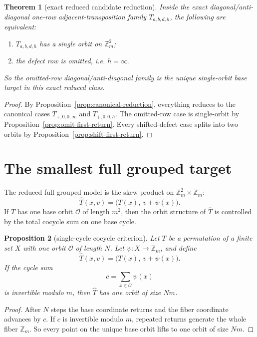 \documentclass[11pt]{article}
\newtheorem{theorem}{Theorem}
\newtheorem{proposition}[theorem]{Proposition}
\begin{document}
\begin{theorem}[exact reduced candidate reduction]
\label{thm:reduced-candidate-reduction}
Inside the exact diagonal/anti-diagonal one-row adjacent-transposition family
$T_{a,b,d,h}$, the following are equivalent:
\begin{enumerate}[label=\textup{(\arabic*)},leftmargin=2.8em]
\item $T_{a,b,d,h}$ has a single orbit on $\mathbb Z_m^2$;
\item the defect row is omitted, i.e. $h=\infty$.
\end{enumerate}
So the omitted-row diagonal/anti-diagonal family is the unique single-orbit
base target in this exact reduced class.
\end{theorem}

\begin{proof}
By Proposition~\ref{prop:canonical-reduction}, everything reduces to the
canonical cases $T_{+,0,0,\infty}$ and $T_{+,0,0,h}$.
The omitted-row case is single-orbit by
Proposition~\ref{prop:omit-first-return}.
Every shifted-defect case splits into two orbits by
Proposition~\ref{prop:shift-first-return}.
\end{proof}

\section{The smallest full grouped target}
The reduced full grouped model is the skew product on
$\mathbb Z_m^2\times\mathbb Z_m$:
\[
 \widehat T(x,v)=\bigl(T(x),\ v+\psi(x)\bigr).
\]
If $T$ has one base orbit $\mathcal O$ of length $m^2$, then the orbit structure
of $\widehat T$ is controlled by the total cocycle sum on one base cycle.

\begin{proposition}[single-cycle cocycle criterion]
\label{prop:cocycle-criterion}
Let $T$ be a permutation of a finite set $X$ with one orbit $\mathcal O$ of
length $N$.
Let $\psi\colon X\to\mathbb Z_m$, and define
\[
 \widehat T(x,v)=\bigl(T(x),\ v+\psi(x)\bigr).
\]
If the cycle sum
\[
 c=\sum_{x\in\mathcal O}\psi(x)
\]
is invertible modulo $m$, then $\widehat T$ has one orbit of size $Nm$.
\end{proposition}

\begin{proof}
After $N$ steps the base coordinate returns and the fiber coordinate advances by
$c$.
If $c$ is invertible modulo $m$, repeated returns generate the whole fiber
$\mathbb Z_m$.
So every point on the unique base orbit lifts to one orbit of size $Nm$.
\end{proof}
\end{document}
